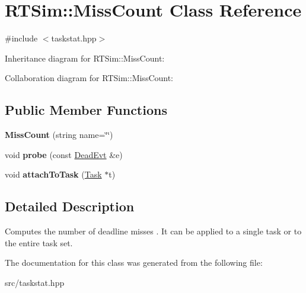 \hypertarget{classRTSim_1_1MissCount}{}\section{R\+T\+Sim\+:\+:Miss\+Count Class Reference}
\label{classRTSim_1_1MissCount}


{\ttfamily \#include $<$taskstat.\+hpp$>$}



Inheritance diagram for R\+T\+Sim\+:\+:Miss\+Count\+:


Collaboration diagram for R\+T\+Sim\+:\+:Miss\+Count\+:
\subsection*{Public Member Functions}
\begin{DoxyCompactItemize}
\item 
{\bfseries Miss\+Count} (string name=\char`\"{}\char`\"{})\hypertarget{classRTSim_1_1MissCount_ad490bd774887592b2fa83c4209be529a}{}\label{classRTSim_1_1MissCount_ad490bd774887592b2fa83c4209be529a}

\item 
void {\bfseries probe} (const \hyperlink{classRTSim_1_1DeadEvt}{Dead\+Evt} \&e)\hypertarget{classRTSim_1_1MissCount_a18bcbfa8d0b593faf77db9ea2a24a92b}{}\label{classRTSim_1_1MissCount_a18bcbfa8d0b593faf77db9ea2a24a92b}

\item 
void {\bfseries attach\+To\+Task} (\hyperlink{classRTSim_1_1Task}{Task} $\ast$t)\hypertarget{classRTSim_1_1MissCount_a58073197e4fcaea5f291173756034e33}{}\label{classRTSim_1_1MissCount_a58073197e4fcaea5f291173756034e33}

\end{DoxyCompactItemize}


\subsection{Detailed Description}
Computes the number of deadline misses . It can be applied to a single task or to the entire task set. 

The documentation for this class was generated from the following file\+:\begin{DoxyCompactItemize}
\item 
src/taskstat.\+hpp\end{DoxyCompactItemize}

